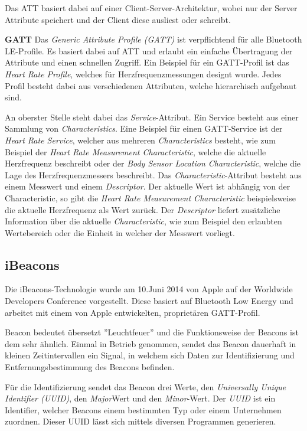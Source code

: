 Das ATT basiert dabei auf einer Client-Server-Architektur, wobei nur der Server Attribute speichert und der Client diese ausliest oder schreibt.

\textbf{GATT}
Das \emph{Generic Attribute Profile (GATT)} ist verpflichtend für alle Bluetooth LE-Profile. Es basiert dabei auf ATT und erlaubt ein einfache Übertragung der Attribute und einen schnellen Zugriff. Ein Beispiel für ein GATT-Profil ist das \emph{Heart Rate Profile}, welches für Herzfrequenzmessungen designt wurde.
Jedes Profil besteht dabei aus verschiedenen Attributen, welche hierarchisch aufgebaut sind.

An oberster Stelle steht dabei das \emph{Service}-Attribut. Ein Service besteht aus einer Sammlung von \emph{Characteristics}. Eine Beispiel für einen GATT-Service ist der \emph{Heart Rate Service}, welcher aus mehreren \emph{Characteristics} besteht, wie zum Beispiel der \emph{Heart Rate Measurement Characteristic}, welche die aktuelle Herzfrequenz beschreibt oder der \emph{Body Sensor Location Characteristic}, welche die Lage des Herzfrequenzmessers beschreibt. 
Das \emph{Characteristic}-Attribut besteht aus einem Messwert und einem \emph{Descriptor}. Der aktuelle Wert ist abhängig von der Characteristic, so gibt die \emph{Heart Rate Measurement Characteristic} beispielsweise die aktuelle Herzfrequenz als Wert zurück. 
Der \emph{Descriptor} liefert zusätzliche Information über die aktuelle \emph{Characteristic}, wie zum Beispiel den erlaubten Wertebereich oder die Einheit in welcher der Messwert vorliegt.


\subsection{iBeacons}
\label{sec:technologies:bluetoothLE:ibeacons}
Die iBeacons-Technologie wurde am 10.Juni 2014 von Apple auf der Worldwide Developers Conference vorgestellt. 
Diese basiert auf Bluetooth Low Energy und arbeitet mit einem von Apple entwickelten, proprietären GATT-Profil.

Beacon bedeutet übersetzt ''Leuchtfeuer'' und die Funktionsweise der Beacons ist dem sehr ähnlich.
Einmal in Betrieb genommen, sendet das Beacon dauerhaft in kleinen Zeitintervallen ein Signal, in welchem sich Daten zur Identifizierung und Entfernungsbestimmung des Beacons befinden.

Für die Identifizierung sendet das Beacon drei Werte, den \emph{Universally Unique Identifier (UUID)}, den \emph{Major}Wert und den \emph{Minor}-Wert.
Der \emph{UUID} ist ein Identifier, welcher Beacons einem bestimmten Typ oder einem Unternehmen zuordnen. Dieser UUID lässt sich mittels diversen Programmen generieren.

